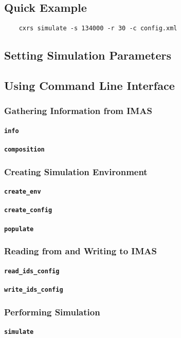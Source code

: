\documentclass[../main.tex]{subfiles}
\begin{document}
\subsection{Quick Example}
\begin{verbatim}
    cxrs simulate -s 134000 -r 30 -c config.xml
\end{verbatim}

\subsection{Setting Simulation Parameters}
\subsection{Using Command Line Interface}
\subsubsection{Gathering Information from IMAS}
\paragraph{\texttt{info}}
\paragraph{\texttt{composition}}
\subsubsection{Creating Simulation Environment}
\paragraph{\texttt{create\_env}}
\paragraph{\texttt{create\_config}}
\paragraph{\texttt{populate}}
\subsubsection{Reading from and Writing to IMAS}
\paragraph{\texttt{read\_ids\_config}}
\paragraph{\texttt{write\_ids\_config}}
\subsubsection{Performing Simulation}
\paragraph{\texttt{simulate}}
\end{document}

